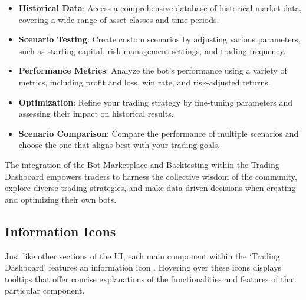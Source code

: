 \begin{itemize}
  \item \textbf{Historical Data}: Access a comprehensive database of historical market data, covering a wide range of asset classes and time periods.
  \item \textbf{Scenario Testing}: Create custom scenarios by adjusting various parameters, such as starting capital, risk management settings, and trading frequency.
  \item \textbf{Performance Metrics}: Analyze the bot's performance using a variety of metrics, including profit and loss, win rate, and risk-adjusted returns.
  \item \textbf{Optimization}: Refine your trading strategy by fine-tuning parameters and assessing their impact on historical results.
  \item \textbf{Scenario Comparison}: Compare the performance of multiple scenarios and choose the one that aligns best with your trading goals.
\end{itemize}

The integration of the Bot Marketplace and Backtesting within the Trading Dashboard empowers traders to harness the collective wisdom of the community, explore diverse trading strategies, and make data-driven decisions when creating and optimizing their own bots.


\subsection{Information Icons}

Just like other sections of the UI, each main component within the `Trading Dashboard' features an information icon . Hovering over these icons displays tooltips that offer concise explanations of the functionalities and features of that particular component.

